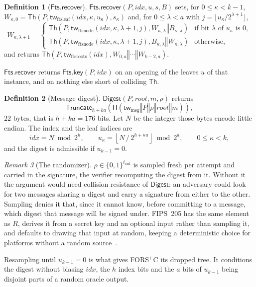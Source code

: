 \documentclass[11pt]{article}
\theoremstyle{definition}
\newtheorem{definition}{Definition}[section]
\theoremstyle{plain}
\theoremstyle{remark}
\newtheorem{remark}[definition]{Remark}
\newcommand{\bits}[1]{\{0,1\}^{#1}}
\newcommand{\Th}{\mathsf{Th}}
\newcommand{\Digest}{\mathsf{Digest}}
\newcommand{\hash}{\mathsf{H}}
\newcommand{\Truncate}{\mathsf{Truncate}}
\newcommand{\concat}{\mathbin\Vert}
\newcommand{\rootnode}{\mathit{root}}
\newcommand{\lrnd}{\ell_{\mathrm{rnd}}}
\newcommand{\idx}{\mathit{idx}}
\newcommand{\FtsKey}{\mathsf{Fts.key}}
\newcommand{\FtsRec}{\mathsf{Fts.recover}}
\begin{document}
\begin{definition}[$\FtsRec$]
$\FtsRec(P,\idx,u,s,B)$ sets, for $0\leq\kappa<k-1$, $W_{\kappa,0}=\Th(P,\mathsf{tw}_{\mathrm{ftsleaf}}(\idx,\kappa,u_\kappa),s_\kappa)$ and, for $0\leq\lambda<a$ with $j=\lfloor u_\kappa/2^{\lambda+1}\rfloor$,
\[
  W_{\kappa,\lambda+1}=
  \begin{cases}
    \Th\!\left(P,\mathsf{tw}_{\mathrm{ftsnode}}(\idx,\kappa,\lambda+1,j),W_{\kappa,\lambda}\concat B_{\kappa,\lambda}\right) & \text{if bit $\lambda$ of $u_\kappa$ is }0,\\[2pt]
    \Th\!\left(P,\mathsf{tw}_{\mathrm{ftsnode}}(\idx,\kappa,\lambda+1,j),B_{\kappa,\lambda}\concat W_{\kappa,\lambda}\right) & \text{otherwise,}
  \end{cases}
\]
and returns $\Th\!\left(P,\mathsf{tw}_{\mathrm{ftsroots}}(\idx),W_{0,a}\concat\cdots\concat W_{k-2,a}\right)$.
\end{definition}

$\FtsRec$ returns $\FtsKey(P,\idx)$ on an opening of the leaves $u$ of that instance, and on nothing else short of colliding $\Th$.

\begin{definition}[Message digest]
$\Digest(P,\rootnode,m,\rho)$ returns
\[
  \Truncate_{h+ka}\!\left(\hash\!\left(\mathsf{tw}_{\mathrm{msg}}\concat P\concat \rho\concat\rootnode\concat m\right)\right),
\]
$22$ bytes, that is $h+ka=176$ bits. Let $N$ be the integer those bytes encode little endian. The index and the leaf indices are
\[
  \idx=N\bmod 2^{h},\qquad
  u_\kappa=\left\lfloor N\,/\,2^{h+\kappa a}\right\rfloor\bmod 2^{a},\qquad 0\leq\kappa<k,
\]
and the digest is admissible if $u_{k-1}=0$.
\end{definition}

\begin{remark}[The randomizer]
\label{rem:rho}
$\rho\in\bits{\lrnd}$ is sampled fresh per attempt and carried in the signature, the verifier recomputing the digest from it. Without it the argument would need collision resistance of $\Digest$: an adversary could look for two messages sharing a digest and carry a signature from either to the other. Sampling denies it that, since it cannot know, before committing to a message, which digest that message will be signed under. FIPS~205 has the same element as $R$, derives it from a secret key and an optional input rather than sampling it, and defaults to drawing that input at random, keeping a deterministic choice for platforms without a random source~\cite{FIPS205}.

Resampling until $u_{k-1}=0$ is what gives FORS$^+$C its dropped tree. It conditions the digest without biasing $\idx$, the $h$ index bits and the $a$ bits of $u_{k-1}$ being disjoint parts of a random oracle output.
\end{remark}
\end{document}
